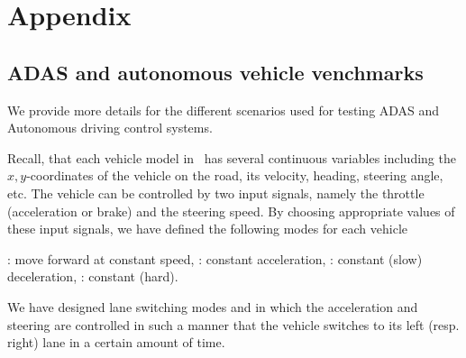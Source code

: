 \section{Appendix}
\label{app:A}

\subsection{ADAS and autonomous vehicle venchmarks}
\label{app:adas}
We provide more details for the different scenarios used for testing ADAS and Autonomous driving control systems.
%

Recall, that each vehicle model in \Simulink\ has several continuous variables including the  $x, y$-coordinates of the vehicle on the road, its velocity, heading, steering angle, etc. 
The vehicle can be controlled by two input signals, namely the throttle (acceleration or brake) and the steering speed.
%
By choosing appropriate values of these input signals, we have defined the following  modes for each vehicle
\begin{inparaenum}[(a)]
	\item {}: move forward at constant speed, 
	: constant acceleration,
	: constant (slow) deceleration,
	: constant (hard).
\end{inparaenum}
We have designed lane switching modes  and  in which the acceleration and steering are controlled in such a manner that the vehicle switches to its left (resp. right) lane in a certain amount of time. 

